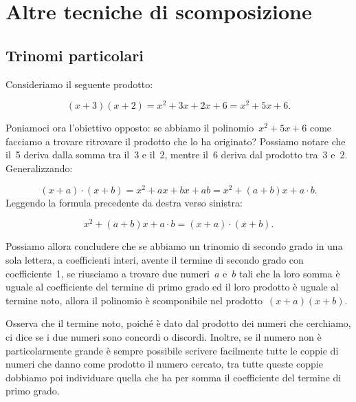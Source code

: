 
\chapter{Altre tecniche di scomposizione}

\section{Trinomi particolari}

Consideriamo il seguente prodotto:

\[(x+3)(x+2)=x^{2}+3x+2x+6=x^{2}+5x+6.\]

Poniamoci ora l'obiettivo opposto: se abbiamo il
polinomio~$x^{2}+5x+6$ come facciamo a trovare ritrovare il prodotto
che lo ha originato? Possiamo notare che il~5 deriva dalla somma tra
il~3 e il~2, mentre il~6 deriva dal prodotto tra~3 e~2. Generalizzando:

\[\left(x+a\right)\cdot \left(x+b\right)=x^{{2}}+ax+bx+ab=x^{2}+\left(a+b\right)x+a\cdot b.\]
Leggendo la formula precedente da destra verso sinistra:

\[x^{{2}}+\left(a+b\right)x+a\cdot b=\left(x+a\right)\cdot\left(x+b\right).\]

Possiamo allora concludere che se abbiamo un trinomio di secondo grado
in una sola lettera, a coefficienti interi, avente il termine di
secondo grado con coefficiente~1, se riusciamo a trovare due numeri~$a$ e~$b$
tali che la loro somma è uguale al
coefficiente del termine di primo grado ed il loro prodotto è uguale
al termine noto, allora il polinomio è scomponibile nel prodotto~$(x+a)(x+b)$.

Osserva che il termine noto, poiché è dato dal prodotto dei numeri
che cerchiamo, ci dice se i due numeri sono concordi o discordi.
Inoltre, se il numero non è particolarmente grande è sempre
possibile scrivere facilmente tutte le coppie di numeri che danno come
prodotto il numero cercato, tra tutte queste coppie dobbiamo poi
individuare quella che ha per somma il coefficiente del termine di
primo grado.

